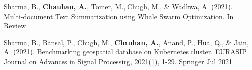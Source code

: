 



\begin{publications}

  \publication
    {} %
    {Sharma, B., \textbf{Chauhan, A.}, Tomer, M., Chugh, M., \& Wadhwa, A. (2021). Multi-document Text Summarization using Whale Swarm Optimization.} %
    {} %
    {In Review} %

  \publication
    {} %
    {Sharma, B., Bansal, P., Chugh, M., \textbf{Chauhan, A.}, Anand, P., Hua, Q., \& Jain, A. (2021). Benchmarking geospatial database on Kubernetes cluster. EURASIP Journal on Advances in Signal Processing, 2021(1), 1-29.} %
    {Springer} %
    {Jul 2021} %

\end{publications}
